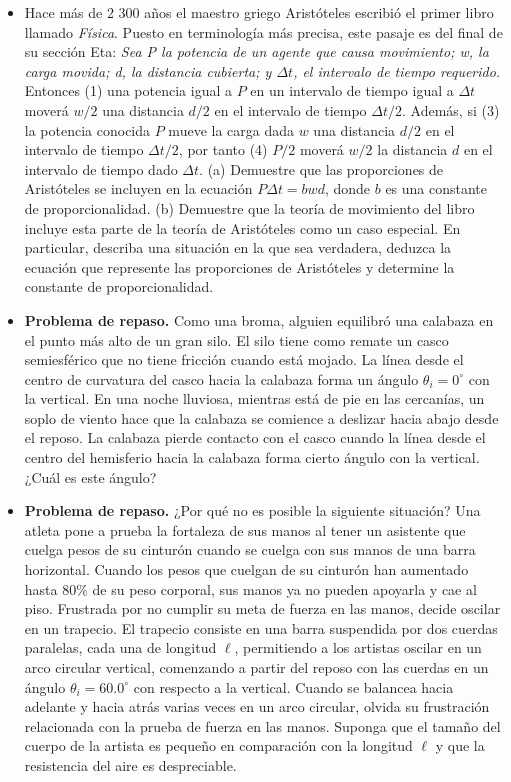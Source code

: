 \documentclass[11pt,a4paper]{article}
\begin{document}
\begin{itemize}
    \item[\textbf{36.}] Hace más de 2 300 años el maestro griego Aristóteles escribió el primer libro llamado \textit{Física}. Puesto en terminología más precisa, este pasaje es del final de su sección Eta: \textit{Sea P la potencia de un agente que causa movimiento; w, la carga movida; d, la distancia cubierta; y $\Delta t$, el intervalo de tiempo requerido.} Entonces (1) una potencia igual a $P$ en un intervalo de tiempo igual a $\Delta t$ moverá $w/2$ una distancia $d/2$ en el intervalo de tiempo $\Delta t/2$. Además, si (3) la potencia conocida $P$ mueve la carga dada $w$ una distancia $d/2$ en el intervalo de tiempo $\Delta t/2$, por tanto (4) $P/2$ moverá $w/2$ la distancia $d$ en el intervalo de tiempo dado $\Delta t$. (a) Demuestre que las proporciones de Aristóteles se incluyen en la ecuación $P\Delta t = bwd$, donde $b$ es una constante de proporcionalidad. (b) Demuestre que la teoría de movimiento del libro incluye esta parte de la teoría de Aristóteles como un caso especial. En particular, describa una situación en la que sea verdadera, deduzca la ecuación que represente las proporciones de Aristóteles y determine la constante de proporcionalidad.
    \vspace*{7cm}

    \item[\textbf{37.}] \textbf{Problema de repaso.} Como una broma, alguien equilibró una calabaza en el punto más alto de un gran silo. El silo tiene como remate un casco semiesférico que no tiene fricción cuando está mojado. La línea desde el centro de curvatura del casco hacia la calabaza forma un ángulo $\theta_i = 0^\circ$ con la vertical. En una noche lluviosa, mientras está de pie en las cercanías, un soplo de viento hace que la calabaza se comience a deslizar hacia abajo desde el reposo. La calabaza pierde contacto con el casco cuando la línea desde el centro del hemisferio hacia la calabaza forma cierto ángulo con la vertical. ¿Cuál es este ángulo?
    \vspace*{6cm}

    \item[\textbf{38.}] \textbf{Problema de repaso.} ¿Por qué no es posible la siguiente situación? Una atleta pone a prueba la fortaleza de sus manos al tener un asistente que cuelga pesos de su cinturón cuando se cuelga con sus manos de una barra horizontal. Cuando los pesos que cuelgan de su cinturón han aumentado hasta $80\%$ de su peso corporal, sus manos ya no pueden apoyarla y cae al piso. Frustrada por no cumplir su meta de fuerza en las manos, decide oscilar en un trapecio. El trapecio consiste en una barra suspendida por dos cuerdas paralelas, cada una de longitud $\ell$, permitiendo a los artistas oscilar en un arco circular vertical, comenzando a partir del reposo con las cuerdas en un ángulo $\theta_i = 60.0^\circ$ con respecto a la vertical. Cuando se balancea hacia adelante y hacia atrás varias veces en un arco circular, olvida su frustración relacionada con la prueba de fuerza en las manos. Suponga que el tamaño del cuerpo de la artista es pequeño en comparación con la longitud $\ell$ y que la resistencia del aire es despreciable.
    \vspace*{6cm}


\end{itemize}
\end{document}
